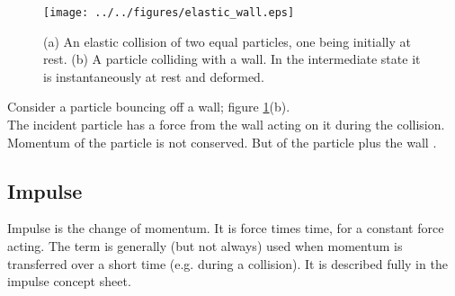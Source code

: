 \begin{figure}[h!]
\centering
\texttt{[image: ../../figures/elastic\_wall.eps]}
\caption{(a) An elastic collision of two equal particles, one being initially at rest. (b) A particle colliding with a wall.  In the intermediate state it is instantaneously at rest and deformed.}\label{fig:elastic_wall}
\end{figure}
\noindent
Consider a particle bouncing off a wall; figure \ref{fig:elastic_wall}(b).\\
The incident particle has a force from the wall acting on it during the collision.  Momentum of the particle is not conserved. But  of the particle plus the wall .\nll
{}


\subsection{Impulse}
Impulse is the change of momentum.  It is force times time, for a constant force acting.  The term is generally (but not always) used when momentum is transferred over a short time (e.g. during a collision).  It is described fully in the impulse concept sheet.


